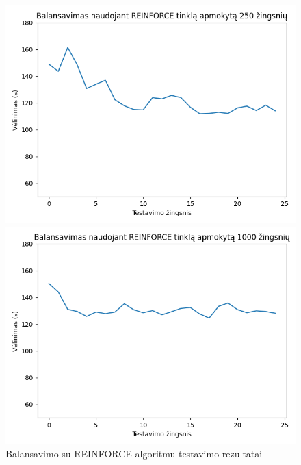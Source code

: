 \documentclass{VUMIFPSbakalaurinis}
\begin{document}
\begin{figure}[H]
\begin{minipage}[b]{0.45\textwidth}
        \includegraphics[width=\textwidth]{img/reinforce_250_2.png}
    \end{minipage}    
    \hspace{1mm}
    \begin{minipage}[b]{0.45\textwidth}
        \includegraphics[width=\textwidth]{img/reinforce_1000_2.png}
    \end{minipage}
    \caption{Balansavimo su REINFORCE algoritmu testavimo rezultatai}
    \label{reinforce–rez}
\end{figure}
\end{document}
